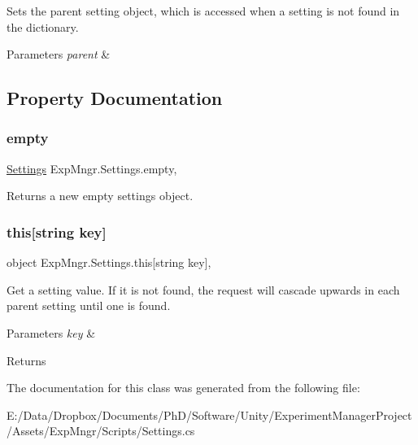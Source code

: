 Sets the parent setting object, which is accessed when a setting is not found in the dictionary. 


\begin{DoxyParams}{Parameters}
{\em parent} & \\
\hline
\end{DoxyParams}


\subsection{Property Documentation}
\mbox{\label{class_exp_mngr_1_1_settings_a9a79c93bbbd6158a6ae543a615da6e6a}} 
\subsubsection{\texorpdfstring{empty}{empty}}
{\footnotesize\ttfamily \hyperlink{class_exp_mngr_1_1_settings}{Settings} Exp\+Mngr.\+Settings.\+empty\hspace{0.3cm}{\ttfamily [static]}, {\ttfamily [get]}}



Returns a new empty settings object. 

\mbox{\label{class_exp_mngr_1_1_settings_a120aa21f86686537a44e92c9f96dd68e}} 
\subsubsection{\texorpdfstring{this[string key]}{this[string key]}}
{\footnotesize\ttfamily object Exp\+Mngr.\+Settings.\+this\mbox{[}string key\mbox{]}\hspace{0.3cm}{\ttfamily [get]}, {\ttfamily [set]}}



Get a setting value. If it is not found, the request will cascade upwards in each parent setting until one is found. 


\begin{DoxyParams}{Parameters}
{\em key} & \\
\hline
\end{DoxyParams}
\begin{DoxyReturn}{Returns}

\end{DoxyReturn}


The documentation for this class was generated from the following file\+:\begin{DoxyCompactItemize}
\item 
E\+:/\+Data/\+Dropbox/\+Documents/\+Ph\+D/\+Software/\+Unity/\+Experiment\+Manager\+Project/\+Assets/\+Exp\+Mngr/\+Scripts/Settings.\+cs\end{DoxyCompactItemize}
